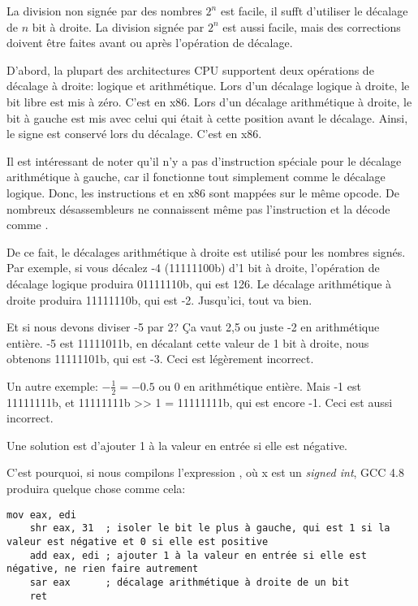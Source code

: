 
La division non signée par des nombres $2^n$ est facile, il sufft d'utiliser le
décalage de $n$ bit à droite.
La division signée par $2^n$ est aussi facile, mais des corrections doivent être
faites avant ou après l'opération de décalage.

D'abord, la plupart des architectures CPU supportent deux opérations de décalage
à droite: logique et arithmétique.
Lors d'un décalage logique à droite, le bit libre est mis à zéro.
C'est  en x86.
Lors d'un décalage arithmétique à droite, le bit à gauche est mis avec celui qui
était à cette position avant le décalage.
Ainsi, le signe est conservé lors du décalage.
C'est  en x86.

Il est intéressant de noter qu'il n'y a pas d'instruction spéciale pour le décalage
arithmétique à gauche, car il fonctionne tout simplement comme le décalage logique.
Donc, les instructions  et  en x86 sont mappées sur le même opcode.
De nombreux désassembleurs ne connaissent même pas l'instruction  et la
décode comme .

De ce fait, le décalages arithmétique à droite est utilisé pour les nombres signés.
Par exemple, si vous décalez -4 (11111100b) d'1 bit à droite, l'opération de décalage
logique produira 01111110b, qui est 126.
Le décalage arithmétique à droite produira 11111110b, qui est -2.
Jusqu'ici, tout va bien.

Et si nous devons diviser -5 par 2? Ça vaut 2,5 ou juste -2 en arithmétique entière.
-5 est 11111011b, en décalant cette valeur de 1 bit à droite, nous obtenons 11111101b,
qui est -3.
Ceci est légèrement incorrect.

Un autre exemple: $-\frac{1}{2}=-0.5$ ou 0 en arithmétique entière.
Mais -1 est 11111111b, et 11111111b >> 1 = 11111111b, qui est encore -1.
Ceci est aussi incorrect.

Une solution est d'ajouter 1 à la valeur en entrée si elle est négative.

C'est pourquoi, si nous compilons l'expression , où x est un \textit{signed int},
GCC 4.8 produira quelque chose comme cela:

\begin{lstlisting}[style=customasmx86]
	mov	eax, edi
	shr	eax, 31  ; isoler le bit le plus à gauche, qui est 1 si la valeur est négative et 0 si elle est positive
	add	eax, edi ; ajouter 1 à la valeur en entrée si elle est négative, ne rien faire autrement
	sar	eax      ; décalage arithmétique à droite de un bit
	ret
\end{lstlisting}

